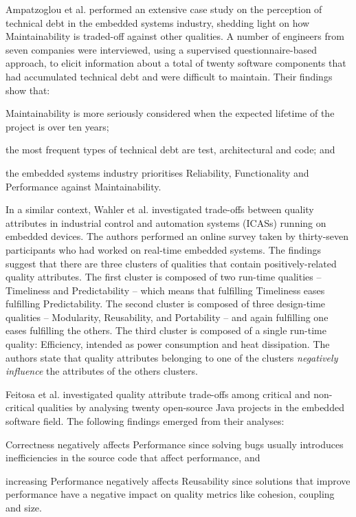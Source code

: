 Ampatzoglou et al. \cite{Ampatzoglou2016} performed an extensive case study on the perception of technical debt in the embedded systems industry, shedding light on how Maintainability is traded-off against other qualities.
A number of engineers from seven companies were interviewed, using a supervised questionnaire-based approach, to elicit information about a total of twenty software components that had accumulated technical debt and were difficult to maintain. 
Their findings show that:
\begin{inlinelist}
    \item Maintainability is more seriously considered when the expected lifetime of the project is over ten years;
    \item the most frequent types of technical debt are test, architectural and code; and
    \item the embedded systems industry prioritises Reliability, Functionality and Performance against Maintainability.
\end{inlinelist}

In a similar context, Wahler et al. \cite{Wahler2017} investigated trade-offs between quality attributes in industrial control and automation systems (ICASs) running on embedded devices.
The authors performed an online survey taken by thirty-seven participants who had worked on real-time embedded systems.
The findings suggest that there are three clusters of qualities that contain positively-related quality attributes.
The first cluster is composed of two run-time qualities -- Timeliness and Predictability -- which means that fulfilling Timeliness eases fulfilling Predictability.
The second cluster is composed of three design-time qualities -- Modularity, Reusability, and Portability -- and again fulfilling one eases fulfilling the others.
The third cluster is composed of a single run-time quality: Efficiency, intended as power consumption and heat dissipation.
The authors state that quality attributes belonging to one of the clusters \textit{negatively influence} the attributes of the others clusters.

Feitosa et al. \cite{Feitosa2015} investigated quality attribute trade-offs among critical and non-critical qualities by analysing twenty open-source Java projects in the embedded software field.
The following findings emerged from their analyses:
\begin{inlinelist}
    \item Correctness negatively affects Performance since solving bugs usually introduces inefficiencies in the source code that affect performance, and
    \item increasing Performance negatively affects Reusability since solutions that improve performance have a negative impact on quality metrics like cohesion, coupling and size.
\end{inlinelist}

